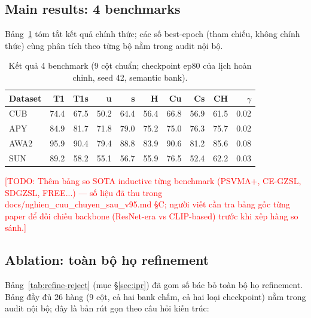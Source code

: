 \documentclass[10pt,twocolumn,letterpaper]{article}
\newcommand{\todo}[1]{\textcolor{red}{[TODO: #1]}}
\begin{document}
\subsection{Main results: 4 benchmarks}
\label{sec:exp:main}

Bảng~\ref{tab:main} tóm tắt kết quả chính thức; các số best-epoch (tham chiếu, không chính thức) cùng phân tích theo từng bộ nằm trong audit nội bộ.

\begin{table}[t]
\centering
\caption{Kết quả 4 benchmark (9 cột chuẩn; checkpoint ep80 của lịch hoàn chỉnh, seed 42, semantic bank).}
\label{tab:main}
\small
\begin{tabular}{lrrrrrrrrr}
\toprule
Dataset & T1 & T1s & u & s & H & Cu & Cs & CH & $\gamma$ \\
\midrule
CUB & 74.4 & 67.5 & 50.2 & 64.4 & 56.4 & 66.8 & 56.9 & 61.5 & 0.02 \\
APY & 84.9 & 81.7 & 71.8 & 79.0 & 75.2 & 75.0 & 76.3 & 75.7 & 0.02 \\
AWA2 & 95.9 & 90.4 & 79.4 & 88.8 & 83.9 & 90.6 & 81.2 & 85.6 & 0.08 \\
SUN & 89.2 & 58.2 & 55.1 & 56.7 & 55.9 & 76.5 & 52.4 & 62.2 & 0.03 \\
\bottomrule
\end{tabular}
\end{table}

\todo{Thêm bảng so SOTA inductive từng benchmark (PSVMA+, CE-GZSL, SDGZSL, FREE...) — số liệu đã thu trong docs/nghien\_cuu\_chuyen\_sau\_v95.md §C; người viết cần tra bảng gốc từng paper để đối chiếu backbone (ResNet-era vs CLIP-based) trước khi xếp hàng so sánh.}

\subsection{Ablation: toàn bộ họ refinement}
\label{sec:ablation}

Bảng~\ref{tab:refine-reject} (mục §\ref{sec:ipr}) đã gom số bác bỏ toàn bộ họ refinement. Bảng đầy đủ 26 hàng (9 cột, cả hai bank chấm, cả hai loại checkpoint) nằm trong audit nội bộ; đây là bản rút gọn theo câu hỏi kiến trúc:
\end{document}
